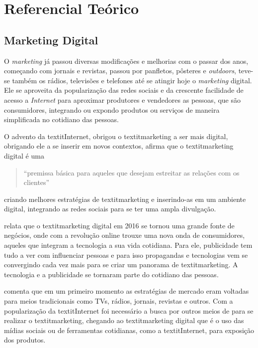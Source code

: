 \chapter[Referencial Teórico]{Referencial Teórico}

\section{Marketing Digital}
O \textit{marketing} já passou diversas modificações e melhorias com o passar dos anos, começando com jornais e revistas, passou por panfletos, pôsteres e \textit{outdoors}, teve-se também os rádios, televisões e telefones até se atingir hoje o \textit{marketing} digital. Ele se aproveita da popularização das redes sociais e da crescente facilidade de acesso a \textit{Internet} para aproximar produtores e vendedores as pessoas, que são consumidores, integrando ou expondo produtos ou serviços de maneira simplificada no cotidiano das pessoas.

O advento da textit{Internet}, obrigou o textit{marketing} a ser mais digital, obrigando ele a se inserir em novos contextos, \cite{canto2017} afirma que o textit{marketing} digital é uma \begin{quote} ``premissa básica para aqueles que desejam estreitar as relações com os clientes''\end{quote} criando melhores estratégias de textit{marketing} e inserindo-as em um ambiente digital, integrando as redes sociais para se ter uma ampla divulgação.

\cite[p.2]{ryan2016} relata que o textit{marketing} digital em 2016 se tornou uma grande fonte de negócios, onde com a revolução online trouxe uma nova onda de consumidores, aqueles que integram a tecnologia a sua vida cotidiana. Para ele, publicidade tem tudo a ver com influenciar pessoas e para isso propagandas e tecnologias vem se convergindo cada vez mais para se criar um panorama de textit{marketing}. A tecnologia e a publicidade se tornaram parte do cotidiano das pessoas.

\cite{santos2014} comenta que em um primeiro momento as estratégias de mercado eram voltadas para meios tradicionais como TVs, rádios, jornais, revistas e outros. Com a popularização da textit{Internet} foi necessário a busca por outros meios de para se realizar
o textit{marketing}, chegando ao textit{marketing} digital que é o uso das mídias sociais ou de ferramentas cotidianas, como a textit{Internet}, para exposição dos produtos.

